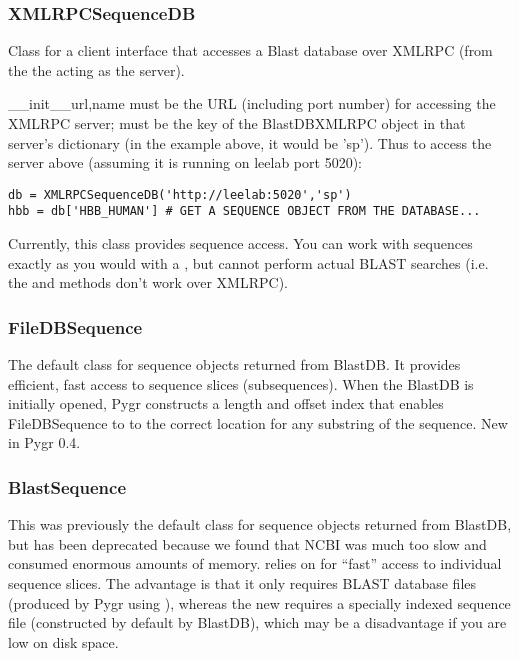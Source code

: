 \documentclass{howto}
\begin{document}
\subsubsection{XMLRPCSequenceDB}
Class for a client interface that accesses a Blast database over
XMLRPC (from the the  acting as the server).
\begin{funcdesc}{__init__}{url,name}
   must be the URL (including port number) for accessing the 
  XMLRPC server;  must be the key of the BlastDBXMLRPC object
  in that server's dictionary (in the example above, it would be 'sp').
  Thus to access the server above (assuming it is running on leelab port 5020):
\begin{verbatim}
db = XMLRPCSequenceDB('http://leelab:5020','sp')
hbb = db['HBB_HUMAN'] # GET A SEQUENCE OBJECT FROM THE DATABASE...
\end{verbatim}
\end{funcdesc}
Currently, this class provides sequence access.  You can work with sequences
exactly as you would with a , but cannot perform actual BLAST searches
(i.e. the  and  methods don't work over XMLRPC).

\subsubsection{FileDBSequence}
The default class for sequence objects returned from BlastDB.  It provides efficient,
fast access to sequence slices (subsequences).  When the BlastDB is initially opened,
Pygr constructs a length and offset index that enables FileDBSequence to 
to the correct location for any substring of the sequence.  New in Pygr 0.4.

\subsubsection{BlastSequence}

This was previously the default class for sequence objects returned from BlastDB,
but has been deprecated because we found that NCBI  was much too slow
and consumed enormous amounts of memory.   relies on
 for ``fast'' access to individual sequence slices.  The advantage is
that it only requires BLAST database files (produced by Pygr using ),
whereas the new  requires a specially indexed sequence file
(constructed by default by BlastDB), which may be a disadvantage if you are low
on disk space.
\end{document}

